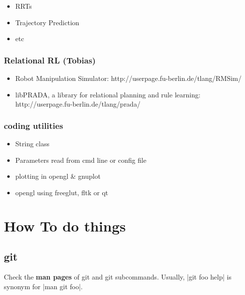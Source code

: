 \begin{itemize}
\item RRTs

\item Trajectory Prediction

\item etc
\end{itemize}



\subsubsection{Relational RL (Tobias)}

\begin{itemize}
\item Robot Manipulation Simulator: http://userpage.fu-berlin.de/tlang/RMSim/

\item libPRADA, a library for relational planning and rule learning: http://userpage.fu-berlin.de/tlang/prada/
\end{itemize}


\subsubsection{coding utilities}

\begin{itemize}
\item String class

\item Parameters read from cmd line or config file

\item plotting in opengl \& gnuplot

\item opengl using freeglut, fltk or qt
\end{itemize}









\section{How To do things}


\subsection{git}\label{secGit}

Check the \textbf{man pages} of git and git subcommands. Usually,
|git foo help| is synonym for |man git foo|.

